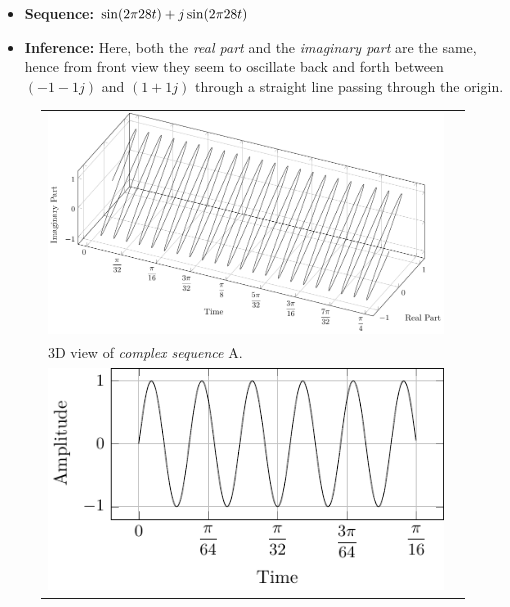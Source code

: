 \documentclass[../../course]{subfiles}
\begin{document}
\begin{itemize} [label=]

    \item \textbf{Sequence:} $\sin(2 \pi 28 t) + j \sin(2 \pi 28 t)$

    \item \textbf{Inference:} Here, both the \emph{real part} and the \emph{imaginary part}
        are the same, hence from front view they seem to oscillate back and forth between $(-1 -1j)$
        and $(1 + 1j)$ through a straight line passing through the origin.

\end{itemize}

\vfill

\begin{figure} [H]

    \renewcommand{\arraystretch}{0.75}
    \centering
    \begin{NiceTabularX} {\textwidth} {
            *{2}{>{\centering\arraybackslash}X}
        }

         {
             {
                \includegraphics[height = \textheight] {tikzpics/plotComplexA.pdf}
            }
        }

        &
        \\

         {
            \vbox{
                 {3D view of \emph{complex sequence} A.}
                \label{plt:cmplxA}
            }
        }

        &
        \\

         {
             {
                \includegraphics[height = \textheight] {tikzpics/plotShortX1.pdf}
            }
        }


\end{NiceTabularX}
\end{figure}
\end{document}
